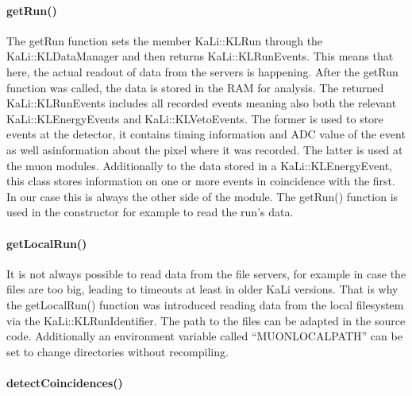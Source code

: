     \paragraph{getRun()}
    \label{ch:Analysis software:sec:methods of the class run:subsec:getRun()}
    
    The getRun function sets the member KaLi::KLRun through the KaLi::KLDataManager and then returns KaLi::KLRunEvents. This means that here, the actual readout of data from the servers is happening. After the getRun function was called, the data is stored in the RAM for analysis. The returned KaLi::KLRunEvents includes all recorded events meaning also both the relevant KaLi::KLEnergyEvents and KaLi::KLVetoEvents. The former is used to store events at the detector, it contains timing information and ADC value of the event as well asinformation about the pixel where it was recorded. The latter is used at the muon modules. Additionally to the data stored in a KaLi::KLEnergyEvent, this class stores information on one or more events in coincidence with the first. In our case this is always the other side of the module. The getRun() function is used in the constructor for example to read the run's data.
    
    \paragraph{getLocalRun()}
    \label{ch:Analysis software:sec:methods of the class run:subsec:getLocalRun()}
    
    It is not always possible to read data from the file servers, for example in case the files are too big, leading to timeouts at least in older KaLi versions. That is why the getLocalRun() function was introduced reading data from the local filesystem via the KaLi::KLRunIdentifier. The path to the files can be adapted in the source code. Additionally an environment variable called ``MUONLOCALPATH'' can be set to change directories without recompiling.
    
    \paragraph{detectCoincidences()}
    \label{ch:Analysis software:sec:methods of the class run:subsec:detectCoincidences()}
    
